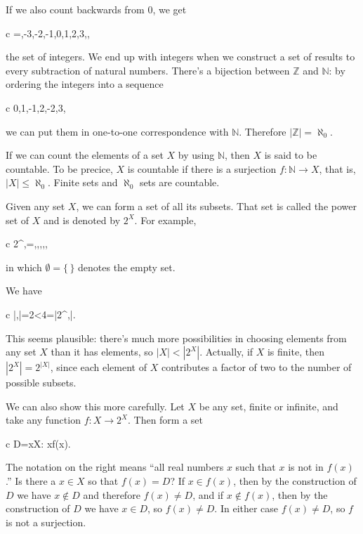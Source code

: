 \documentclass[11pt,oneside,%
]{memoir}
\newenvironment{eqna}{\begin{IEEEeqnarray}{c}}{\end{IEEEeqnarray}\ignorespacesafterend}
\theoremstyle{definition}
\newcommand{\NN}{\mathbb{N}}
\newcommand{\ZZ}{\mathbb{Z}}
\begin{document}
If we also count backwards from \(0\), we get
\begin{eqna}
    \ZZ=\lbrace\dotsc,-3,-2,-1,0,1,2,3,\dotsc\rbrace,
\end{eqna}
the set of integers. We end up with integers when we construct a set of results to every subtraction of natural numbers. There's a bijection between \(\ZZ\) and \(\NN\): by ordering the integers into a sequence
\begin{eqna}
    0,1,-1,2,-2,3,\dotsc
\end{eqna}
we can put them in one-to-one correspondence with \(\NN\). Therefore  \(|\ZZ|=\aleph_0\).

If we can count the elements of a set \(X\) by using \(\NN\), then \(X\) is said to be countable. To be precice, \(X\) is countable if there is a surjection \(f:\NN\rightarrow X\), that is, \(|X|\leq\aleph_0\). Finite sets and \(\aleph_0\) sets are countable.

Given any set \(X\), we can form a set of all its subsets. That set is called the power set of \(X\) and is denoted by \(2^X\). For example,
\begin{eqna}
    2^{\lbrace\uparrow,\downarrow\rbrace}=\lbrace\emptyset,\lbrace\uparrow\rbrace,\lbrace\downarrow\rbrace,\lbrace\uparrow,\downarrow\rbrace\rbrace,
\end{eqna}
in which \(\emptyset=\lbrace\,\rbrace\) denotes the empty set.

We have
\begin{eqna}
    |\lbrace\uparrow,\downarrow\rbrace|=2<4=|2^{\lbrace\uparrow,\downarrow\rbrace}|.
\end{eqna}
This seems plausible: there's much more possibilities in choosing elements from any set \(X\) than it has elements, so \(|X|<|2^X|\). Actually, if \(X\) is finite, then \(|2^X|=2^{|X|}\), since each element of \(X\) contributes a factor of two to the number of possible subsets.

We can also show this more carefully. Let \(X\) be any set, finite or infinite, and take any function \(f:X\rightarrow 2^X\). Then form a set
\begin{eqna}
    D=\lbrace x\in X: x\notin f(x)\rbrace.
\end{eqna}
The notation on the right means ``all real numbers \(x\) such that \(x\) is not in \(f(x)\).'' Is there a \(x\in X\) so that \(f(x)=D\)? If \(x\in f(x)\), then by the construction of \(D\) we have \(x\notin D\) and therefore \(f(x)\neq D\), and if \(x\notin f(x)\), then by the construction of \(D\) we have \(x\in D\), so \(f(x)\neq D\). In either case \(f(x)\neq D\), so \(f\) is not a surjection.
\end{document}
